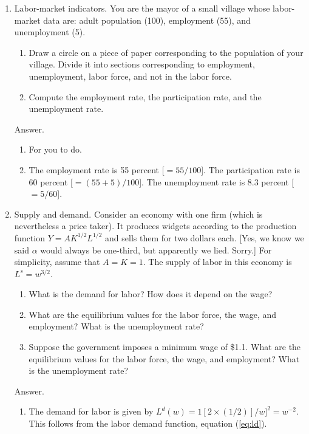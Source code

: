 \begin{enumerate}
\item Labor-market indicators.
You are the mayor of a small village whose
labor-market data are: adult population (100), employment (55), and
unemployment (5).
\begin{enumerate}
\item Draw a circle on a piece of paper corresponding to the
population of your village. Divide it into sections corresponding
to employment, unemployment, labor force, and not in the labor
force.

\item Compute the employment rate, the participation rate, and the unemployment rate.
\end{enumerate}

Answer.
\begin{enumerate}
\item For you to do.

\item The employment rate is 55 percent [$= 55/100$].
The participation rate is 60 percent [$= (55+5)/100$].
The unemployment rate is 8.3 percent [$= 5/60$].
\end{enumerate}

\item Supply and demand. Consider an economy with one firm (which
is nevertheless a price taker).  It produces widgets according to
the production function $Y = A K^{1/2}L^{1/2}$ and sells them for
two dollars each.
[Yes, we know we said $\alpha$ would always be one-third,
but apparently we lied.  Sorry.]
For simplicity, assume that $A = K = 1$.  The
supply of labor in this economy is $L^{s}=w^{3/2}$.
%
\begin{enumerate}
\item What is the demand for labor?  How does it depend on the wage?

\item What are the equilibrium values for the labor force, the
wage, and employment? What is the unemployment rate?

\item Suppose the government imposes a minimum wage of \$1.1. What
are the equilibrium values for the labor force, the wage, and
employment? What is the unemployment rate?
\end{enumerate}

Answer.
%
\begin{enumerate}
\item The demand for labor is given by $L^{d}(w) = 1 [ 2 \times
(1/2)]/{w}]^{2} = w^{-2}$.
This follows from the labor demand function, equation (\ref{eq:ld}).


\end{enumerate}
\end{enumerate}
